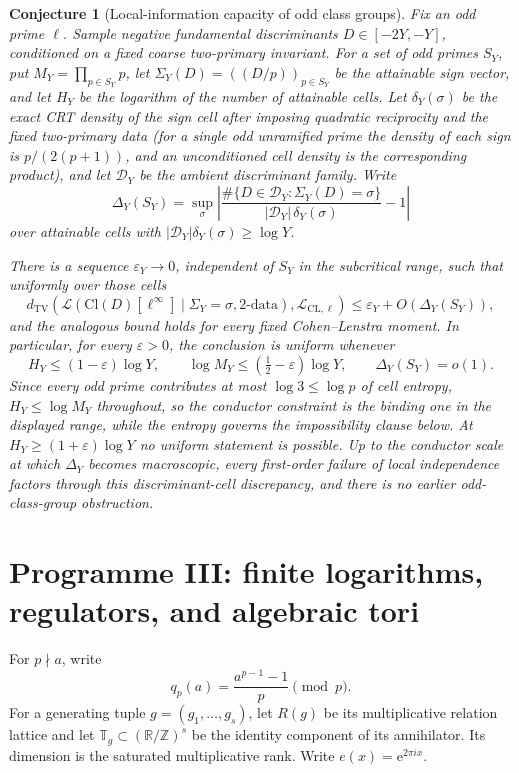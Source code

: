 \documentclass[11pt]{article}
\newtheorem{conjecture}{Conjecture}
\theoremstyle{definition}
\newcommand{\e}{\mathrm{e}}
\newcommand{\Z}{\mathbb Z}
\newcommand{\R}{\mathbb R}
\newcommand{\T}{\mathbb T}
\newcommand{\eps}{\varepsilon}
\providecommand{\Z}{\mathbb Z}
\providecommand{\R}{\mathbb R}
\providecommand{\T}{\mathbb T}
\begin{document}
\begin{conjecture}[Local-information capacity of odd class groups]\label{s10}
Fix an odd prime $\ell$.  Sample negative fundamental discriminants
$D\in[-2Y,-Y]$, conditioned on a fixed coarse two-primary invariant.  For a set of
odd primes $S_Y$, put $M_Y=\prod_{p\in S_Y}p$, let $\Sigma_Y(D)=((D/p))_{p\in S_Y}$ be the
attainable sign vector, and let $H_Y$ be the logarithm of the number of attainable cells.
Let $\delta_Y(\sigma)$ be the exact CRT density of the sign cell after imposing quadratic reciprocity and the fixed two-primary data (for a single odd unramified prime the density of each sign is $p/(2(p+1))$, and an unconditioned cell density is the corresponding product), and let $\mathcal D_Y$ be the
ambient discriminant family.  Write
\[
 \Delta_Y(S_Y)=\sup_\sigma
 \left|\frac{\#\{D\in\mathcal D_Y:\Sigma_Y(D)=\sigma\}}
 {|\mathcal D_Y|\,\delta_Y(\sigma)}-1\right|
\]
over attainable cells with $|\mathcal D_Y|\delta_Y(\sigma)\ge\log Y$.

There is a sequence $\varepsilon_Y\to0$, independent of $S_Y$ in the subcritical range,
such that uniformly over those cells
\[
 d_{\mathrm{TV}}\!\left(
 \mathcal L(\mathrm{Cl}(D)[\ell^\infty]\mid\Sigma_Y=\sigma,\text{2-data}),
 \mathcal L_{\mathrm{CL},\ell}\right)
 \le \varepsilon_Y+O(\Delta_Y(S_Y)),
\]
and the analogous bound holds for every fixed Cohen--Lenstra moment.  In particular,
for every $\eps>0$, the conclusion is uniform whenever
\[
 H_Y\le(1-\eps)\log Y,
 \qquad \log M_Y\le(\tfrac12-\eps)\log Y,
 \qquad \Delta_Y(S_Y)=o(1).
\]
Since every odd prime contributes at most $\log3\le\log p$ of cell entropy,
$H_Y\le\log M_Y$ throughout, so
the conductor constraint is the binding one in the displayed range, while the entropy
governs the impossibility clause below.
At $H_Y\ge(1+\eps)\log Y$ no uniform statement is possible.  Up to the conductor scale
at which $\Delta_Y$ becomes macroscopic, every first-order failure of local independence
factors through this discriminant-cell discrepancy, and there is no earlier
odd-class-group obstruction.
\end{conjecture}

\section{Programme III: finite logarithms, regulators, and algebraic tori}

For $p\nmid a$, write
\[
 q_p(a)=\frac{a^{p-1}-1}{p}\pmod p.
\]
For a generating tuple $g=(g_1,\ldots,g_s)$, let $R(g)$ be its multiplicative
relation lattice and let $\T_g\subset(\R/\Z)^s$ be the identity component of its
annihilator.  Its dimension is the saturated multiplicative rank. Write $e(x)=\e^{2\pi ix}$.
\end{document}
